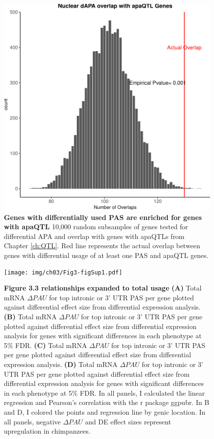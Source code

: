 \begin{figure}[!htb]
\centering
\includegraphics[width=5in]{img/ch03/Fig2_figSup3.pdf}
\caption[Genes with differentially used PAS are enriched for genes with apaQTL ]{\textbf{Genes with differentially used PAS are enriched for genes with apaQTL} 10,000 random subsamples of genes tested for differential APA and overlap with genes with apaQTLs from Chapter \ref{ch:QTL}. Red line represents the actual overlap between genes with differential usage of at least one PAS and apaQTL genes.}
\label{fig:ch03-dPASQTL}
\end{figure}
\clearpage


\begin{figure}[!htb]
\centering
\texttt{[image: img/ch03/Fig3-figSup1.pdf]}
\caption[Figure 3.3 relationships expanded to total usage]{\textbf{Figure 3.3 relationships expanded to total usage} {\bf (A)}  Total mRNA  $\Delta PAU$ for top intronic or 3' UTR PAS per gene plotted against differential effect size from differential expression analysis. {\bf (B)} Total mRNA $\Delta PAU$ for top intronic or 3' UTR PAS per gene plotted against differential effect size from differential expression analysis for genes with significant differences in each phenotype at 5\% FDR. {\bf (C)} Total mRNA $\Delta PAU$ for top intronic or 3' UTR PAS per gene plotted against differential effect size from differential expression analysis. {\bf (D)} Total mRNA $\Delta PAU$ for top intronic or 3' UTR PAS per gene plotted against differential effect size from differential expression analysis for genes with significant differences in each phenotype at 5\% FDR. In all panels, I calculated the linear regression and Pearson's correlation with the r package ggpubr. In B and D, I  colored the points and regression line by genic location. In all panels, negative $\Delta PAU$ and DE effect sizes represent upregulation in chimpanzees.}
\label{fig:ch03-totalDPASDE}
\end{figure}
\clearpage


